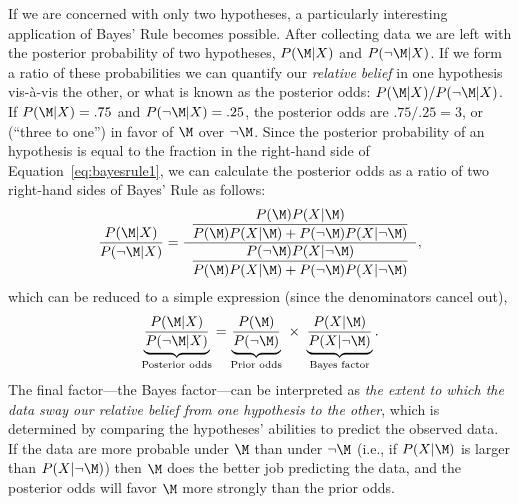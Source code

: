 If we are concerned with only two hypotheses, a particularly interesting application of Bayes' Rule becomes possible. After collecting data we are left with the posterior probability of two hypotheses, $P(\M|X)$ and $P(\neg\M|X)$. If we form a ratio of these probabilities we can quantify our \emph{relative belief} in one hypothesis vis-\`a-vis the other, or what is known as the posterior odds:
$P(\M|X)/P(\neg\M|X)$. If $P(\M|X) = .75$ and $P(\neg\M|X) = .25$, the posterior odds are $.75/.25 = 3$, or  (``three to one'') in favor of $\M$ over $\neg\M$. Since the posterior probability of an hypothesis is equal to the fraction in the right-hand side of Equation~\ref{eq:bayesrule1}, we can calculate the posterior odds as a ratio of two right-hand sides of Bayes' Rule as follows:
$$
\dfrac{P(\M|X)}{P(\neg\M|X)} = \dfrac{\,\,\,\dfrac{P(\M)P(X|\M)}{P(\M)P(X|\M) + P(\neg{\M})P(X|\neg{\M})}\,\,\,}{\dfrac{P(\neg\M)P(X|\neg\M)}{P(\M)P(X|\M) + P(\neg{\M})P(X|\neg{\M})}},
$$
which can be reduced to a simple expression (since the denominators cancel out),
\begin{equation}
\underbrace{\frac{P(\M|X)} {P(\neg\M|X)}}_\text{Posterior odds} =
\underbrace{\frac{P(\M)}{P(\neg\M)}}_\text{Prior odds} \ \times \
\underbrace{\frac{P(X|\M)}{P(X|\neg\M)}}_\text{Bayes factor}.\label{eq:bayesodds}
\end{equation}
The final factor---the Bayes factor---can be interpreted as \emph{the extent to which the data sway our relative belief from one hypothesis to the other}, which is determined by comparing the hypotheses' abilities to predict the observed data. If the data are more probable under $\M$ than under $\neg \M$ (i.e., if $P(X|\M)$ is larger than $P(X|\neg \M)$) then $\M$ does the better job predicting the data, and the posterior odds will favor $\M$ more strongly than the prior odds.

